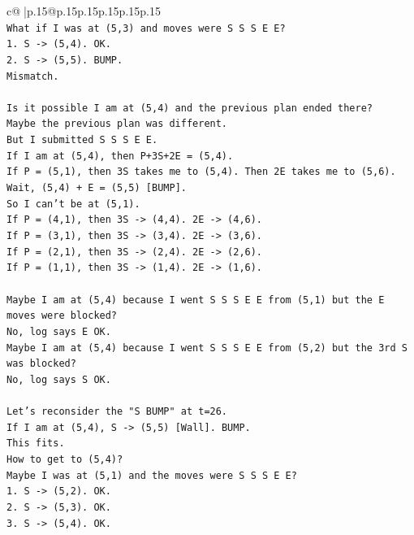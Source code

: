 \documentclass{article}
\begin{document}
{\begin{supertabular}{c@{$\;$}|p{.15\linewidth}@{}p{.15\linewidth}p{.15\linewidth}p{.15\linewidth}p{.15\linewidth}p{.15\linewidth}}
{{{\\ 
\texttt{What if I was at (5,3) and moves were S S S E E?} \\
\texttt{1. S {-}> (5,4). OK.} \\
\texttt{2. S {-}> (5,5). BUMP.} \\
\texttt{Mismatch.} \\
\\ 
\texttt{Is it possible I am at (5,4) and the previous plan ended there?} \\
\texttt{Maybe the previous plan was different.} \\
\texttt{But I submitted S S S E E.} \\
\texttt{If I am at (5,4), then P+3S+2E = (5,4).} \\
\texttt{If P = (5,1), then 3S takes me to (5,4). Then 2E takes me to (5,6).} \\
\texttt{Wait, (5,4) + E = (5,5) {[}BUMP{]}.} \\
\texttt{So I can't be at (5,1).} \\
\texttt{If P = (4,1), then 3S {-}> (4,4). 2E {-}> (4,6).} \\
\texttt{If P = (3,1), then 3S {-}> (3,4). 2E {-}> (3,6).} \\
\texttt{If P = (2,1), then 3S {-}> (2,4). 2E {-}> (2,6).} \\
\texttt{If P = (1,1), then 3S {-}> (1,4). 2E {-}> (1,6).} \\
\\ 
\texttt{Maybe I am at (5,4) because I went S S S E E from (5,1) but the E moves were blocked?} \\
\texttt{No, log says E OK.} \\
\texttt{Maybe I am at (5,4) because I went S S S E E from (5,2) but the 3rd S was blocked?} \\
\texttt{No, log says S OK.} \\
\\ 
\texttt{Let's reconsider the "S BUMP" at t=26.} \\
\texttt{If I am at (5,4), S {-}> (5,5) {[}Wall{]}. BUMP.} \\
\texttt{This fits.} \\
\texttt{How to get to (5,4)?} \\
\texttt{Maybe I was at (5,1) and the moves were S S S E E?} \\
\texttt{1. S {-}> (5,2). OK.} \\
\texttt{2. S {-}> (5,3). OK.} \\
\texttt{3. S {-}> (5,4). OK.} \\
}}}
\end{supertabular}}
\end{document}
